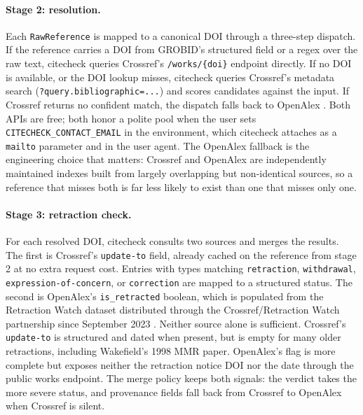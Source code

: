 \documentclass[12pt]{article}
\begin{document}
\paragraph{Stage 2: resolution.} Each \texttt{RawReference} is mapped to a canonical DOI through a three-step dispatch. If the reference carries a DOI from GROBID's structured field or a regex over the raw text, citecheck queries Crossref's \texttt{/works/\{doi\}} endpoint directly. If no DOI is available, or the DOI lookup misses, citecheck queries Crossref's metadata search (\texttt{?query.bibliographic=...}) and scores candidates against the input. If Crossref returns no confident match, the dispatch falls back to OpenAlex \citep{openalex}. Both APIs are free; both honor a polite pool when the user sets \texttt{CITECHECK\_CONTACT\_EMAIL} in the environment, which citecheck attaches as a \texttt{mailto} parameter and in the user agent. The OpenAlex fallback is the engineering choice that matters: Crossref and OpenAlex are independently maintained indexes built from largely overlapping but non-identical sources, so a reference that misses both is far less likely to exist than one that misses only one.

\paragraph{Stage 3: retraction check.} For each resolved DOI, citecheck consults two sources and merges the results. The first is Crossref's \texttt{update-to} field, already cached on the reference from stage 2 at no extra request cost. Entries with types matching \texttt{retraction}, \texttt{withdrawal}, \texttt{expression-of-concern}, or \texttt{correction} are mapped to a structured status. The second is OpenAlex's \texttt{is\_retracted} boolean, which is populated from the Retraction Watch dataset distributed through the Crossref/Retraction Watch partnership since September 2023 \citep{retraction_watch,openalex}. Neither source alone is sufficient. Crossref's \texttt{update-to} is structured and dated when present, but is empty for many older retractions, including Wakefield's 1998 MMR paper. OpenAlex's flag is more complete but exposes neither the retraction notice DOI nor the date through the public works endpoint. The merge policy keeps both signals: the verdict takes the more severe status, and provenance fields fall back from Crossref to OpenAlex when Crossref is silent.
\end{document}
